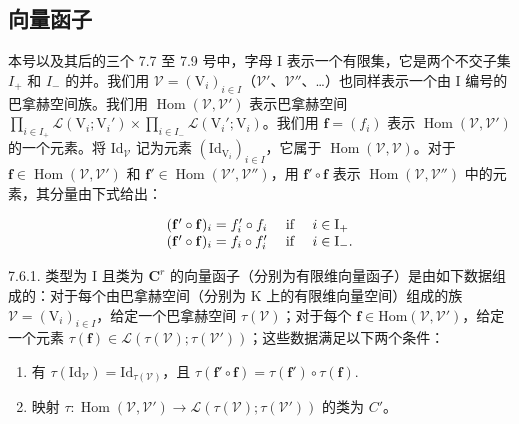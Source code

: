 \subsection{向量函子}

本号以及其后的三个 7.7 至 7.9 号中，字母 I 表示一个有限集，它是两个不交子集 \(I_+\) 和 \(I_-\) 的并。我们用 \(\mathcal{V} = (\mathrm{V}_{i})_{i\in I}\)（\(\mathcal{V}'\)、\(\mathcal{V}''\)、\ldots）也同样表示一个由 I 编号的巴拿赫空间族。我们用 \(\operatorname{Hom}(\mathcal{V},\mathcal{V}')\) 表示巴拿赫空间 \(\prod_{i\in I_+}\mathcal{L}(\mathrm{V}_i;\mathrm{V}_i')\times \prod_{i\in I_-}\mathcal{L}(\mathrm{V}_i';\mathrm{V}_i)\)。我们用 \(\mathbf{f} = (f_i)\) 表示 \(\operatorname{Hom}(\mathcal{V},\mathcal{V}')\) 的一个元素。将 \(\mathrm{Id}_{\mathcal{V}}\) 记为元素 \((\mathrm{Id}_{\mathrm{V}_i})_{i\in I}\)，它属于 \(\operatorname{Hom}(\mathcal{V},\mathcal{V})\)。对于 \(\mathbf{f}\in \operatorname{Hom}(\mathcal{V},\mathcal{V}')\) 和 \(\mathbf{f}'\in \operatorname{Hom}(\mathcal{V}',\mathcal{V}'')\)，用 \(\mathbf{f}'\circ \mathbf{f}\) 表示 \(\operatorname{Hom}(\mathcal{V},\mathcal{V}'')\) 中的元素，其分量由下式给出：

\[
\begin{array}{l l} (\mathbf {f} ^ {\prime} \circ \mathbf {f}) _ {i} = f _ {i} ^ {\prime} \circ f _ {i} & \text { if } \quad i \in \mathrm{I} _ {+} \\ (\mathbf {f} ^ {\prime} \circ \mathbf {f}) _ {i} = f _ {i} \circ f _ {i} ^ {\prime} & \text { if } \quad i \in \mathrm{I} _ {-}. \end{array}
\]

7.6.1. 类型为 I 且类为 \(\mathbf{C}^r\) 的向量函子（分别为有限维向量函子）是由如下数据组成的：对于每个由巴拿赫空间（分别为 K 上的有限维向量空间）组成的族 \(\mathcal{V} = (\mathrm{V}_i)_{i\in I}\)，给定一个巴拿赫空间 \(\tau(\mathcal{V})\)；对于每个 \(\mathbf{f}\in\mathrm{Hom}(\mathcal{V},\mathcal{V}')\)，给定一个元素 \(\tau(\mathbf{f})\in\mathcal{L}(\tau(\mathcal{V});\tau(\mathcal{V}'))\)；这些数据满足以下两个条件：

\begin{enumerate}
\def\labelenumi{(\alph{enumi})}
\item
  有 \(\tau (\mathrm{Id}_{\mathcal{V}}) = \mathrm{Id}_{\tau (\mathcal{V})}\)，且 \(\tau (\mathbf{f}'\circ \mathbf{f}) = \tau (\mathbf{f}')\circ \tau (\mathbf{f}).\)
\item
  映射 \(\tau : \operatorname{Hom}(\mathcal{V}, \mathcal{V}') \to \mathcal{L}(\tau(\mathcal{V}); \tau(\mathcal{V}'))\) 的类为 \(C'\)。
\end{enumerate}

